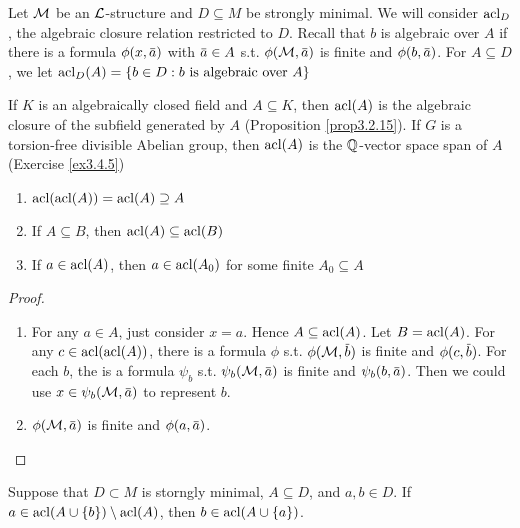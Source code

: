 \documentclass[11pt]{article}
\begin{document}
Let \(\mathcal{M}\) be an \(\mathcal{L}\)-structure and \(D\subseteq M\) be strongly minimal. We will consider \(\text{acl}_D\),
the algebraic closure relation restricted to \(D\). Recall that \(b\) is algebraic over \(A\) if
there is a formula \(\phi(x,\bara)\) with \(\bara\in A\) s.t. \(\phi(\calm,\bara)\) is finite
and \(\phi(b,\bara)\). For \(A\subseteq D\), we let \(\text{acl}_D(A)=\{b\in D:b\text{ is algebraic over }A\}\)

If \(K\) is an algebraically closed field and \(A\subseteq K\), then \(\text{acl}(A)\) is the algebraic
closure of the subfield generated by \(A\) (Proposition \ref{prop3.2.15}). If \(G\) is a
torsion-free divisible Abelian group, then \(\text{acl}(A)\) is the \(\mathbb{Q}\)-vector space span of \(A\)
(Exercise \ref{ex3.4.5})

\begin{lemma}[]
\begin{enumerate}
\item \(\text{acl}(\text{acl}(A))=\text{acl}(A)\supseteq A\)
\item If \(A\subseteq B\), then \(\text{acl}(A)\subseteq\text{acl}(B)\)
\item If \(a\in\text{acl}(A)\), then \(a\in\text{acl}(A_0)\) for some finite \(A_0\subseteq A\)
\end{enumerate}
\end{lemma}

\begin{proof}
\begin{enumerate}
\item For any \(a\in A\), just consider \(x=a\). Hence \(A\subseteq\text{acl}(A)\). Let \(B=\text{acl}(A)\). For
any \(c\in\text{acl}(\text{acl}(A))\), there is a formula \(\phi\) s.t. \(\phi(\calm,\barb)\) is finite
and \(\phi(c,\barb)\). For each \(b\), the is a formula \(\psi_b\) s.t. \(\psi_b(\calm,\bara)\) is finite
and \(\psi_b(b,\bara)\). Then we could use \(x\in\psi_b(\calm,\bara)\) to represent \(b\).
\setcounter{enumi}{2}
\item \(\phi(\calm,\bara)\) is finite and \(\phi(a,\bara)\).
\end{enumerate}
\end{proof}

\begin{lemma}
Suppose that \(D\subset M\) is storngly minimal, \(A\subseteq D\), and \(a,b\in D\).
If \(a\in\text{acl}(A\cup\{b\})\setminus\text{acl}(A)\), then \(b\in\text{acl}(A\cup\{a\})\).
\end{lemma}

\end{document}
